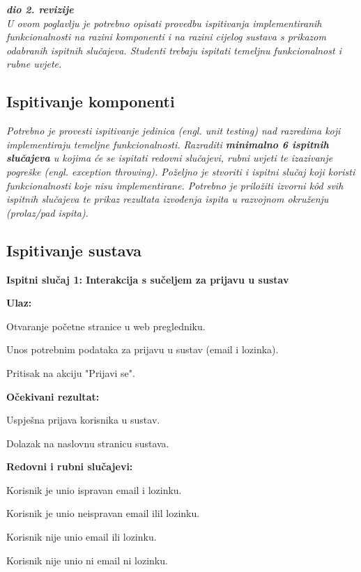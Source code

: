 			\textbf{\textit{dio 2. revizije}}\\
			
			 \textit{U ovom poglavlju je potrebno opisati provedbu ispitivanja implementiranih funkcionalnosti na razini komponenti i na razini cijelog sustava s prikazom odabranih ispitnih slučajeva. Studenti trebaju ispitati temeljnu funkcionalnost i rubne uvjete.}
	
			
			\subsection{Ispitivanje komponenti}
			\textit{Potrebno je provesti ispitivanje jedinica (engl. unit testing) nad razredima koji implementiraju temeljne funkcionalnosti. Razraditi \textbf{minimalno 6 ispitnih slučajeva} u kojima će se ispitati redovni slučajevi, rubni uvjeti te izazivanje pogreške (engl. exception throwing). Poželjno je stvoriti i ispitni slučaj koji koristi funkcionalnosti koje nisu implementirane. Potrebno je priložiti izvorni kôd svih ispitnih slučajeva te prikaz rezultata izvođenja ispita u razvojnom okruženju (prolaz/pad ispita). }
			
			
			
\subsection{Ispitivanje sustava}

\textbf{Ispitni slučaj 1: Interakcija s sučeljem za prijavu u sustav}

\noindent \textbf{Ulaz:}
\begin{packed_enum}
	\item Otvaranje početne stranice u web pregledniku.
	\item Unos potrebnim podataka za prijavu u sustav (email i lozinka).
	\item Pritisak na akciju "Prijavi se".
\end{packed_enum}

\noindent \textbf{Očekivani rezultat:}
\begin{packed_enum}
	\item Uspješna prijava korisnika u sustav.
	\item Dolazak na naslovnu stranicu sustava.
\end{packed_enum}

\noindent \textbf{Redovni i rubni slučajevi:}
\begin{packed_enum}
	\item Korisnik je unio ispravan email i lozinku.
	\item Korisnik je unio neispravan email ilil lozinku.
	\item Korisnik nije unio email ili lozinku.
	\item Korisnik nije unio ni email ni lozinku.
\end{packed_enum}

